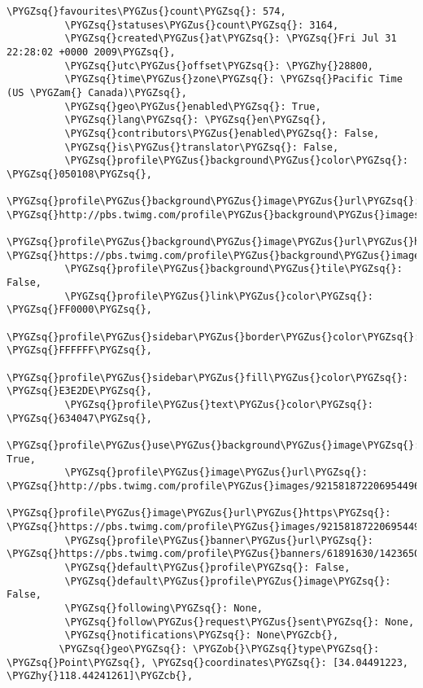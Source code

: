 \documentclass[letterpaper,10pt,english]{sphinxmanual}
\begin{document}
\begin{Verbatim}[commandchars=\\\{\}]
          \PYGZsq{}favourites\PYGZus{}count\PYGZsq{}: 574,
          \PYGZsq{}statuses\PYGZus{}count\PYGZsq{}: 3164,
          \PYGZsq{}created\PYGZus{}at\PYGZsq{}: \PYGZsq{}Fri Jul 31 22:28:02 +0000 2009\PYGZsq{},
          \PYGZsq{}utc\PYGZus{}offset\PYGZsq{}: \PYGZhy{}28800,
          \PYGZsq{}time\PYGZus{}zone\PYGZsq{}: \PYGZsq{}Pacific Time (US \PYGZam{} Canada)\PYGZsq{},
          \PYGZsq{}geo\PYGZus{}enabled\PYGZsq{}: True,
          \PYGZsq{}lang\PYGZsq{}: \PYGZsq{}en\PYGZsq{},
          \PYGZsq{}contributors\PYGZus{}enabled\PYGZsq{}: False,
          \PYGZsq{}is\PYGZus{}translator\PYGZsq{}: False,
          \PYGZsq{}profile\PYGZus{}background\PYGZus{}color\PYGZsq{}: \PYGZsq{}050108\PYGZsq{},
          \PYGZsq{}profile\PYGZus{}background\PYGZus{}image\PYGZus{}url\PYGZsq{}: \PYGZsq{}http://pbs.twimg.com/profile\PYGZus{}background\PYGZus{}images/812409981/afaa27bf78e5a0e0f394e29f6ca71e2c.jpeg\PYGZsq{},
          \PYGZsq{}profile\PYGZus{}background\PYGZus{}image\PYGZus{}url\PYGZus{}https\PYGZsq{}: \PYGZsq{}https://pbs.twimg.com/profile\PYGZus{}background\PYGZus{}images/812409981/afaa27bf78e5a0e0f394e29f6ca71e2c.jpeg\PYGZsq{},
          \PYGZsq{}profile\PYGZus{}background\PYGZus{}tile\PYGZsq{}: False,
          \PYGZsq{}profile\PYGZus{}link\PYGZus{}color\PYGZsq{}: \PYGZsq{}FF0000\PYGZsq{},
          \PYGZsq{}profile\PYGZus{}sidebar\PYGZus{}border\PYGZus{}color\PYGZsq{}: \PYGZsq{}FFFFFF\PYGZsq{},
          \PYGZsq{}profile\PYGZus{}sidebar\PYGZus{}fill\PYGZus{}color\PYGZsq{}: \PYGZsq{}E3E2DE\PYGZsq{},
          \PYGZsq{}profile\PYGZus{}text\PYGZus{}color\PYGZsq{}: \PYGZsq{}634047\PYGZsq{},
          \PYGZsq{}profile\PYGZus{}use\PYGZus{}background\PYGZus{}image\PYGZsq{}: True,
          \PYGZsq{}profile\PYGZus{}image\PYGZus{}url\PYGZsq{}: \PYGZsq{}http://pbs.twimg.com/profile\PYGZus{}images/921581872206954496/QksJ\PYGZus{}AK\PYGZus{}\PYGZus{}normal.jpg\PYGZsq{},
          \PYGZsq{}profile\PYGZus{}image\PYGZus{}url\PYGZus{}https\PYGZsq{}: \PYGZsq{}https://pbs.twimg.com/profile\PYGZus{}images/921581872206954496/QksJ\PYGZus{}AK\PYGZus{}\PYGZus{}normal.jpg\PYGZsq{},
          \PYGZsq{}profile\PYGZus{}banner\PYGZus{}url\PYGZsq{}: \PYGZsq{}https://pbs.twimg.com/profile\PYGZus{}banners/61891630/1423650146\PYGZsq{},
          \PYGZsq{}default\PYGZus{}profile\PYGZsq{}: False,
          \PYGZsq{}default\PYGZus{}profile\PYGZus{}image\PYGZsq{}: False,
          \PYGZsq{}following\PYGZsq{}: None,
          \PYGZsq{}follow\PYGZus{}request\PYGZus{}sent\PYGZsq{}: None,
          \PYGZsq{}notifications\PYGZsq{}: None\PYGZcb{},
         \PYGZsq{}geo\PYGZsq{}: \PYGZob{}\PYGZsq{}type\PYGZsq{}: \PYGZsq{}Point\PYGZsq{}, \PYGZsq{}coordinates\PYGZsq{}: [34.04491223, \PYGZhy{}118.44241261]\PYGZcb{},

\end{Verbatim}
\end{document}
